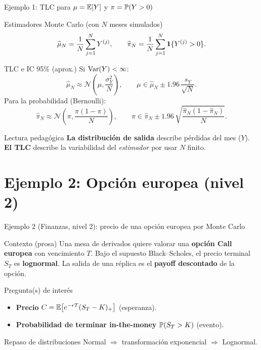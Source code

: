 \documentclass[aspectratio=1610, 9pt]{beamer}
\begin{document}
\begin{frame}{Ejemplo 1: TLC para $\mu=\mathbb{E}[Y]$ y $\pi=\mathbb{P}(Y>0)$}
\small
\begin{block}{Estimadores Monte Carlo (con $N$ meses simulados)}
\[
\widehat{\mu}_N=\frac{1}{N}\sum_{j=1}^N Y^{(j)},\qquad
\widehat{\pi}_N=\frac{1}{N}\sum_{j=1}^N \mathbf{1}\{Y^{(j)}>0\}.
\]
\end{block}

\begin{block}{TLC e IC 95\% (aprox.)}
Si $\operatorname{Var}(Y)<\infty$:
\[
\widehat{\mu}_N \approx \mathcal{N}\!\left(\mu,\frac{\sigma_Y^2}{N}\right),
\qquad
\mu\in \widehat{\mu}_N \pm 1.96\,\frac{s_Y}{\sqrt{N}}.
\]
Para la probabilidad (Bernoulli):
\[
\widehat{\pi}_N \approx \mathcal{N}\!\left(\pi,\frac{\pi(1-\pi)}{N}\right),
\qquad
\pi\in \widehat{\pi}_N \pm 1.96\,\sqrt{\frac{\widehat{\pi}_N(1-\widehat{\pi}_N)}{N}}.
\]
\end{block}

\begin{alertblock}{Lectura pedagógica}
\textbf{La distribución de salida} describe pérdidas del mes ($Y$).
\textbf{El TLC} describe la variabilidad del \emph{estimador} por usar $N$ finito.
\end{alertblock}
\end{frame}

\section*{Ejemplo 2: Opción europea (nivel 2)}

\begin{frame}{Ejemplo 2 (Finanzas, nivel 2): precio de una opción europea por Monte Carlo}
\small
\begin{block}{Contexto (prosa)}
Una mesa de derivados quiere valorar una \textbf{opción Call europea} con vencimiento $T$.
Bajo el supuesto Black--Scholes, el precio terminal $S_T$ es \textbf{lognormal}.
La salida de una réplica es el \textbf{payoff descontado} de la opción.
\end{block}

\begin{block}{Pregunta(s) de interés}
\begin{itemize}
\item \textbf{Precio} $C=\mathbb{E}\big[e^{-rT}(S_T-K)_+\big]$ (esperanza).
\item \textbf{Probabilidad de terminar in-the-money} $\mathbb{P}(S_T>K)$ (evento).
\end{itemize}
\end{block}

\begin{alertblock}{Repaso de distribuciones}
Normal $\Rightarrow$ transformación exponencial $\Rightarrow$ Lognormal.
\end{alertblock}
\end{frame}
\end{document}
